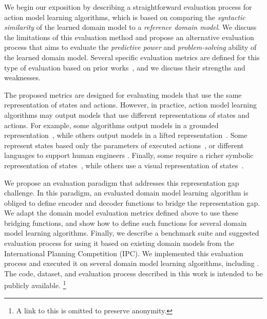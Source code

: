 \documentclass{article}
\theoremstyle{definition}
\theoremstyle{remark}
\newif\ifaddcomments
\newcommand{\roni}[1]{\ifaddcomments{\textcolor{red}{[Roni: #1]}}\fi}
\begin{document}
We begin our exposition by describing a straightforward evaluation process for action model learning algorithms, which is based on comparing the \emph{syntactic similarity} of the learned domain model to a \emph{reference domain model}. We discuss the limitations of this evaluation method and propose an alternative evaluation process that aims to evaluate the \emph{predictive power} and \emph{problem-solving} ability of the learned domain model. 
Several specific evaluation metrics are defined for this type of evaluation based on prior works~\citep{aineto2019learning,juba2021safe,mordoch2024safe,Oswald2024DLLMDomainModeling}, and we discuss their strengths and weaknesses. 


The proposed metrics are designed for evaluating models that use the same representation of states and actions. 
However, in practice, action model learning algorithms may output models that use different representations of states and actions. 
For example, some algorithms output models in a grounded representation~\citep{stern2017efficient}, while others output models in a lifted representation~\citep{aineto2019learning,juba2021safe,xi2024neuro}. 
Some represent states based only the parameters of executed actions~\citep{cresswell2011generalised}, or different languages to support human engineers \citep{mccluskey2010action}. 
Finally, some require a richer symbolic representation of states~\citep{juba2021safe}, while others use a visual representation of states~\citep{asai2018classical, xi2024neuro}.
\roni{All: add references and refine the above and add more examples of representation gap.}
We propose an evaluation paradigm that addresses this representation gap challenge. 
In this paradigm, an evaluated domain model learning algorithm is obliged to define encoder and decoder functions to bridge the representation gap. 
We adapt the domain model evaluation metrics defined above to use these bridging functions, 
and show how to define such functions for several domain model learning algorithms. 
Finally, we describe a benchmark suite and suggested evaluation process for using it based on existing domain models from the International Planning Competition (IPC). 
We implemented this evaluation process and executed it on several domain model learning algorithms, including \roni{TODO: what do we have}. 
The code, dataset, and evaluation process described in this work is intended to be publicly available.
\footnote{A link to this is omitted to preserve anonymity.} 
\end{document}
